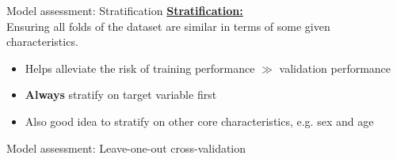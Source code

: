 \documentclass[10pt]{beamer}
\newcommand{\PythonInputNode}[6]{%
    \node[
        minimum width=#4,
        text width=#4,
        align=left,
        inner sep=0pt,
        outer sep=0pt,
        anchor=north west,
        label={[blue,
                anchor=north east,
                font=\ttfamily\fontsize{\the\numexpr#5-1\relax}{#5}\selectfont,
                inner sep=0pt,
                outer sep=0pt,
                xshift=-3pt,
                yshift=-3pt
                ]north west:In{[}#1{]}:},
    ] (#3) at #2 {
    \begin{lstlisting}[
        style=PythonInput,
        linewidth=#4,
        basicstyle=\ttfamily\fontsize{\the\numexpr#5-1\relax}{#5}\selectfont,
        numberstyle=\fontsize{\the\numexpr#5-1\relax}{#5}\selectfont\color[RGB]{128, 128, 128},
    ]^^J
        #6
    \end{lstlisting}
    };
}
\newcommand{\RInputNode}[5]{
    \node[
        minimum width=#3,
        text width=#3,
        align=left,
        inner sep=0pt,
        outer sep=0pt,
        draw=black,
        anchor=north west
    ] (#2) at #1 {
        \begin{lstlisting}[
            style=RInput,
            linewidth=\textwidth,
            basicstyle=\ttfamily\fontsize{\the\numexpr#4-1\relax}{#4}\selectfont,
            numberstyle=\fontsize{\the\numexpr#4-1\relax}{#4}\selectfont\color[RGB]{128, 128, 128},
        ]^^J
            #5
        \end{lstlisting}
    };
}
\begin{document}
    \begin{frame}{Model assessment: Stratification} %
        \textbf{\underline{Stratification:}}\\
        Ensuring all folds of the dataset are similar in terms of some given characteristics.
        \begin{itemize}
            \item Helps alleviate the risk of training performance $\gg$ validation performance
            \item \textbf{Always} stratify on target variable first
            \item Also good idea to stratify on other core characteristics, e.g. sex and age
        \end{itemize}
        \vspace{0.3cm}
    \end{frame}

    \begin{frame}{Model assessment: Leave-one-out cross-validation} %
        \centering
    \end{frame}
\end{document}
